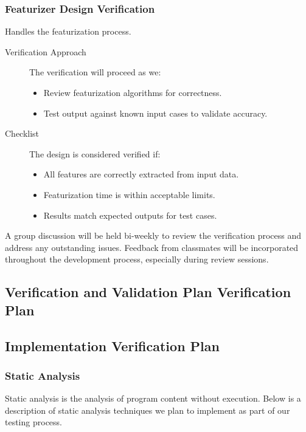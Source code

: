 \documentclass[12pt, titlepage]{article}
\begin{document}
\subsubsection{Featurizer Design Verification}
Handles the featurization process.
\begin{description}
  \item[Verification Approach] The verification will proceed as we:
  \begin{itemize}[leftmargin=0cm]
    \item Review featurization algorithms for correctness.
    \item Test output against known input cases to validate accuracy.
  \end{itemize}
  \item[Checklist] The design is considered verified if:
    \begin{itemize}[label=$\square$,leftmargin=0cm]
    \item All features are correctly extracted from input data.
    \item Featurization time is within acceptable limits.
    \item Results match expected outputs for test cases.
  \end{itemize}
\end{description}

A group discussion will be held bi-weekly to review the verification process and address any outstanding issues. Feedback from classmates will be incorporated throughout the development process, especially during review sessions.

\subsection{Verification and Validation Plan Verification Plan}




\subsection{Implementation Verification Plan}
\subsubsection{Static Analysis}
Static analysis is the analysis of program content without execution. Below is a description of static analysis techniques we plan to implement as part of our testing process.
\end{document}
